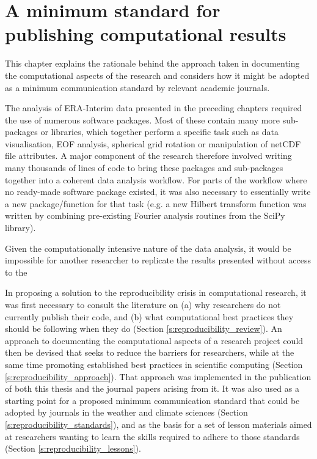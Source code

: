 
\chapter{A minimum standard for publishing computational results}\label{c:reproducibility}


\begin{synopsis}
This chapter explains the rationale behind the approach taken in documenting the computational aspects of the research and considers how it might be adopted as a minimum communication standard by relevant academic journals.
\vspace{1cm}
\end{synopsis}



The analysis of ERA-Interim data presented in the preceding chapters required the use of numerous software packages. Most of these contain many more sub-packages or libraries, which together perform a specific task such as data visualisation, EOF analysis, spherical grid rotation or manipulation of netCDF file attributes. A major component of the research therefore involved writing many thousands of lines of code to bring these packages and sub-packages together into a coherent data analysis workflow. For parts of the workflow where no ready-made software package existed, it was also necessary to essentially write a new package/function for that task (e.g. a new Hilbert transform function was written by combining pre-existing Fourier analysis routines from the SciPy library).

Given the computationally intensive nature of the data analysis, it would be impossible for another researcher to replicate the results presented without access to the 


In proposing a solution to the reproducibility crisis in computational research, it was first necessary to consult the literature on (a) why researchers do not currently publish their code, and (b) what computational best practices they should be following when they do (Section \ref{s:reproducibility_review}). An approach to documenting the computational aspects of a research project could then be devised that seeks to reduce the barriers for researchers, while at the same time promoting established best practices in scientific computing (Section \ref{s:reproducibility_approach}). That approach was implemented in the publication of both this thesis and the journal papers arising from it. It was also used as a starting point for a proposed minimum communication standard that could be adopted by journals in the weather and climate sciences (Section \ref{s:reproducibility_standards}), and as the basis for a set of lesson materials aimed at researchers wanting to learn the skills required to adhere to those standards (Section \ref{s:reproducibility_lessons}). 


